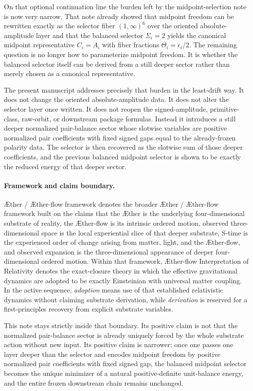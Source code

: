 \documentclass[11pt]{article}
\newcommand{\Aether}{\AE{}ther}
\newcommand{\Aflow}{\AE{}ther-flow}
\newcommand{\TheoryName}{\Aflow{} Interpretation of Relativity}
\newcommand{\TheoryProgram}{\Aether{} / \Aflow{} framework}
\begin{document}
On that optional continuation line the burden left by the midpoint-selection note is now very narrow. That note already showed that midpoint freedom can be rewritten exactly as the selector fiber \((1,\infty)^{6}\) over the oriented absolute-amplitude layer and that the balanced selector \(\Sigma_i=2\) yields the canonical midpoint representative \(C_i=A_i\) with fiber fractions \(\Theta_i=\epsilon_i/2\). The remaining question is no longer how to parameterize midpoint freedom. It is whether the balanced selector itself can be derived from a still deeper sector rather than merely chosen as a canonical representative.

The present manuscript addresses precisely that burden in the least-drift way. It does not change the oriented absolute-amplitude data. It does not alter the selector layer once written. It does not reopen the signed-amplitude, primitive-class, raw-orbit, or downstream package formulas. Instead it introduces a still deeper normalized pair-balance sector whose slotwise variables are positive normalized pair coefficients with fixed signed gaps equal to the already-frozen polarity data. The selector is then recovered as the slotwise sum of those deeper coefficients, and the previous balanced midpoint selector is shown to be exactly the reduced energy of that deeper sector.

\paragraph{Framework and claim boundary.}
\TheoryProgram{} denotes the broader \Aether{} / \Aflow{} framework built on the claims that the \Aether{} is the underlying four-dimensional substrate of reality, the \Aflow{} is its intrinsic ordered motion, observed three-dimensional space is the local experiential slice of that deeper substrate, S-time is the experienced order of change arising from matter, light, and the \Aflow{}, and observed expansion is the three-dimensional appearance of deeper four-dimensional ordered motion. Within that framework, \TheoryName{} denotes the exact-closure theory in which the effective gravitational dynamics are adopted to be exactly Einsteinian with universal matter coupling. In the active sequence, \emph{adoption} means use of that established relativistic dynamics without claiming substrate derivation, while \emph{derivation} is reserved for a first-principles recovery from explicit substrate variables.

This note stays strictly inside that boundary. Its positive claim is not that the normalized pair-balance sector is already uniquely forced by the whole substrate action without new input. Its positive claim is narrower: once one passes one layer deeper than the selector and encodes midpoint freedom by positive normalized pair coefficients with fixed signed gap, the balanced midpoint selector becomes the unique minimizer of a natural positive-definite unit-balance energy, and the entire frozen downstream chain remains unchanged.
\end{document}
